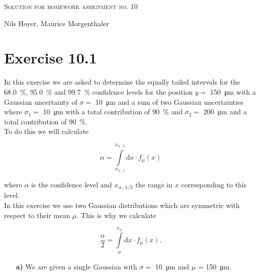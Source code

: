 \documentclass[10pt]{article}
\newenvironment{myfont}{\fontfamily{put}\selectfont}{\par}
\begin{document}
\begin{myfont}

\begin{center}
  \begin{Large}
    \textsc{Solution for homework assignment no. 10} \\
  \end{Large}
  \vspace*{0.4cm}
    Nils Hoyer, Maurice Morgenthaler
  \vspace*{1cm}
\end{center}

\section*{Exercise 10.1}

In this exercise we are asked to determine the equally tailed intervals for the \SI{68.0}{\percent}, \SI{95.0}{\percent} and \SI{99.7}{\percent} confidence levels for the position $y =$ \SI{150}{\micro\metre} with a Gaussian uncertainty of $\sigma =$ \SI{10}{\micro\metre} and a sum of two Gaussian uncertainties where $\sigma_{1} =$ \SI{10}{\micro\metre} with a total contribution of \SI{90}{\percent} and $\sigma_{2} =$  \SI{200}{\micro\metre} and a total contribution of \SI{90}{\percent}. \\

\noindent To do this we will calculate

\begin{equation}
  \alpha = \int\limits_{x_{\alpha\, ,\, 1}}^{x_{\alpha\, ,\, 2}} \textrm{d}x \cdot f_{\mu}(x)
\end{equation}

\noindent where $\alpha$ is the confidence level and $x_{\alpha \, , \, 1/2}$ the range in $x$ corresponding to this level. \\
In this exercise we use two Gaussian distributions which are symmetric with respect to their mean $\mu$.
This is why we calculate

\begin{equation}
  \frac{\alpha}{2} = \int\limits_{\mu}^{x_{\alpha}} \textrm{d}x \cdot f_{\mu}(x).
\end{equation}

\begin{itemize}
  \item[\textbf{a)}] We are given a single Gaussian with $\sigma =$ \SI{10}{\micro\metre} and $\mu$ = \SI{150}{\micro\metre}.


\end{itemize}
\end{myfont}
\end{document}
